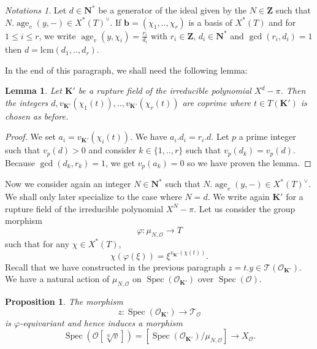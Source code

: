 \documentclass{proc-l}
\newcommand{\Z}{\mathbf{Z}}
\newcommand{\K}{\mathbf{K}}
\newcommand{\N}{\mathbf{N}}
\newcommand{\base}{\mathbf{b}}
\DeclareMathOperator{\Spec}{Spec}
\DeclareMathOperator{\age}{age}
\newcommand{\stackT}{\mathcal{T}}
\newcommand{\sheafO}{\mathcal{O}}
\newtheorem{lemma}[theorem]{Lemma}
\newtheorem{prop}[theorem]{Proposition}
\theoremstyle{definition}
\theoremstyle{remark}
\newtheorem{Notations}[theorem]{Notations}
\numberwithin{equation}{section}
\begin{document}
\begin{Notations}\label{notation_entier_lcm_local_degree}
    Let $d \in \N^*$ be a generator of the ideal given by the $N \in \Z$ such that $N . \age_v(y,-) \in X^*(T)^{\vee}$. If $\base = (\chi_1,..,\chi_r)$ is a basis of $X^*(T)$ and for $1 \leqslant i \leqslant r$, we write $\age_v(y,\chi_i) = \frac{r_i}{d_i}$ with $r_i \in \Z$, $d_i \in \N^*$ and $\gcd(r_i,d_i) = 1$ then $d = \text{lcm}(d_1,..,d_r)$.
\end{Notations}

In the end of this paragraph, we shall need the following lemma:

\begin{lemma}\label{lemma_representabilite_stacky_lift}
    Let $\K'$ be a rupture field of the irreducible polynomial $X^d - \pi$. Then the integers $d, v_{\K'}(\chi_1(t)),..,v_{\K'}(\chi_r(t))$ are coprime where $t \in T(\K')$ is chosen as before.
\end{lemma}

\begin{proof}
    We set $a_i = v_{\K'}(\chi_i(t))$. We have $ a_i . d_i = r_i . d$. Let $p$ a prime integer such that $v_p(d) > 0$ and consider $k \in \{1,..,r\}$ such that $v_p(d_k) = v_p(d)$. Because $\gcd(d_k,r_k) = 1$, we get $v_p(a_k) = 0$ so we have proven the lemma.
\end{proof}

Now we consider again an integer $N \in \N^*$ such that $N . \age_v(y,-) \in X^*(T)^{\vee}$. We shall only later specialize to the case where $N = d$. We write again $\K'$ for a rupture field of the irreducible polynomial $X^N - \pi$. Let us consider the group morphism $$\varphi : \mu_{N,\sheafO} \rightarrow T$$ such that for any $\chi \in X^*(T)$, $$\chi(\varphi(\xi)) = \xi^{v_{\K'}\left(\chi(t)\right)} .$$Recall that we have constructed in the previous paragraph $z = t . y \in \stackT(\sheafO_{\K'})$. We have a natural action of $\mu_{N,\sheafO}$ on $\Spec(\sheafO_{\K'})$ over $\Spec(\sheafO)$.

\begin{prop}
    The morphism $$z : \Spec(\sheafO_{\K'}) \rightarrow \stackT_{\sheafO}$$ is $\varphi$-equivariant and hence induces a morphism $$\Spec(\sheafO[\sqrt[N]{v}]) = [\Spec(\sheafO_{\K'}) / \mu_{N,\sheafO}] \rightarrow X_{\sheafO} .$$
\end{prop}
\end{document}
